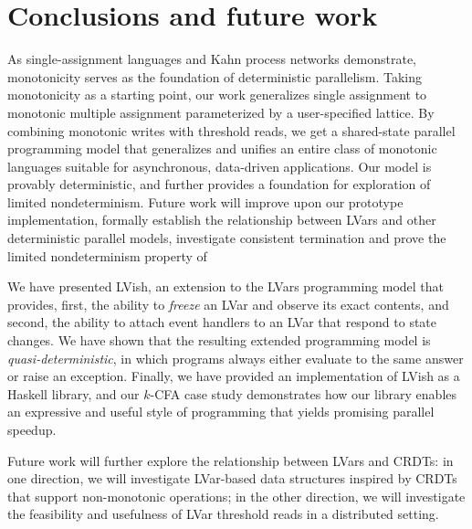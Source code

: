 \chapter{Conclusions and future work}\label{ch:conclusion} %



As single-assignment languages and Kahn process networks demonstrate,
monotonicity serves as the foundation of deterministic parallelism.
Taking monotonicity as a starting point, our work generalizes single
assignment to monotonic multiple assignment parameterized by a
user-specified lattice.  By combining monotonic writes with threshold
reads, we get a shared-state parallel programming model that
generalizes and unifies an entire class of monotonic languages
suitable for asynchronous, data-driven applications.  Our model is
provably deterministic, and further provides a foundation for
exploration of limited nondeterminism.  Future work will improve upon
our prototype implementation, formally establish the relationship between
LVars and other deterministic parallel models,
investigate consistent termination %
and prove the
limited nondeterminism property of %


We have presented LVish, an extension to the LVars programming model
that provides, first, the ability to \emph{freeze} an LVar and observe
its exact contents, and second, the ability to attach event handlers
to an LVar that respond to state changes.  We have shown that the
resulting extended programming model is \emph{quasi-deterministic}, in
which programs always either evaluate to the same answer or raise an
exception.  Finally, we have provided an implementation of LVish as a
Haskell library, and our $k$-CFA case study demonstrates how our
library enables an expressive and useful style of programming that
yields promising parallel speedup.


Future work will further explore the relationship between LVars and
CRDTs: in one direction, we will investigate LVar-based data
structures inspired by CRDTs that support non-monotonic operations; in
the other direction, we will investigate the feasibility and
usefulness of LVar threshold reads in a distributed setting.

